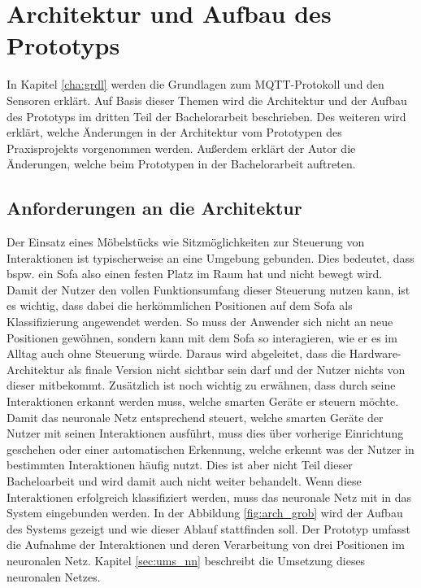 \chapter{Architektur und Aufbau des Prototyps}
\label{cha:arch_pro}
In Kapitel \ref{cha:grdl} werden die Grundlagen zum MQTT-Protokoll und den Sensoren erklärt. Auf Basis dieser Themen wird die Architektur und der Aufbau des Prototyps im dritten Teil der Bachelorarbeit beschrieben. Des weiteren wird erklärt, welche Änderungen in der Architektur vom Prototypen des Praxisprojekts vorgenommen werden. Außerdem erklärt der Autor die Änderungen, welche beim Prototypen in der Bachelorarbeit auftreten.

\section{Anforderungen an die Architektur}
Der Einsatz eines Möbelstücks wie Sitzmöglichkeiten zur Steuerung von Interaktionen ist typischerweise an eine Umgebung gebunden. Dies bedeutet, dass bspw. ein Sofa also einen festen Platz im Raum hat und nicht bewegt wird. Damit der Nutzer den vollen Funktionsumfang dieser Steuerung nutzen kann, ist es wichtig, dass dabei die herkömmlichen Positionen auf dem Sofa als Klassifizierung angewendet werden. So muss der Anwender sich nicht an neue Positionen gewöhnen, sondern kann mit dem Sofa so interagieren, wie er es im Alltag auch ohne Steuerung würde. 
\newline
\newline
Daraus wird abgeleitet, dass die Hardware-Architektur als finale Version nicht sichtbar sein darf und der Nutzer nichts von dieser mitbekommt. Zusätzlich ist noch wichtig zu erwähnen, dass durch seine Interaktionen erkannt werden muss, welche smarten Geräte er steuern möchte. Damit das neuronale Netz entsprechend steuert, welche smarten Geräte der Nutzer mit seinen Interaktionen ausführt, muss dies über vorherige Einrichtung geschehen oder einer automatischen Erkennung, welche erkennt was der Nutzer in bestimmten Interaktionen häufig nutzt. Dies ist aber nicht Teil dieser Bacheloarbeit und wird damit auch nicht weiter behandelt. Wenn diese Interaktionen erfolgreich klassifiziert werden, muss das neuronale Netz mit in das System eingebunden werden. 
\newline
In der Abbildung \ref{fig:arch_grob} wird der Aufbau des Systems gezeigt und wie dieser Ablauf stattfinden soll. Der Prototyp umfasst die Aufnahme der Interaktionen und deren Verarbeitung von drei Positionen im neuronalen Netz. Kapitel \ref{sec:ums_nn} beschreibt die Umsetzung dieses neuronalen Netzes.

